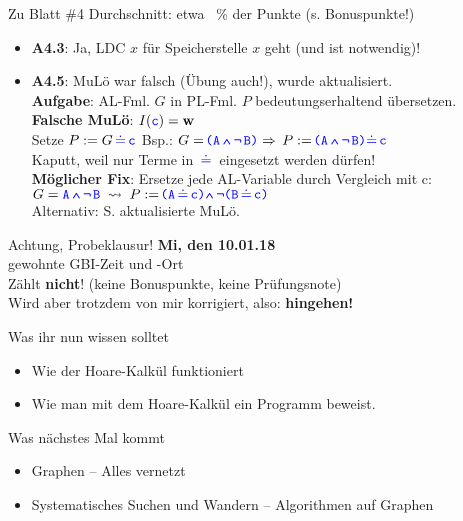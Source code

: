 \begin{frame}{Zu Blatt \#4}
	Durchschnitt: \quad etwa ~\% der Punkte (s. Bonuspunkte!)
	\begin{itemize}
		\item \textbf{A4.3}: Ja, LDC $x$ für Speicherstelle $x$ geht (und ist notwendig)!
		\item \textbf{A4.5}: MuLö war falsch (Übung auch!), wurde aktualisiert. \\
			  \textbf{Aufgabe}: \; AL-Fml. $G$ in PL-Fml. $P$ bedeutungserhaltend übersetzen. \\ 
			  \pause
			  \textbf{Falsche MuLö}: \; $I(\hbox{\textcolor{blue}{\texttt{c}}}) = \hbox{\textbf{w}}$ \\
			  \quad Setze $P := G \pleq \word c$ \qquad Bsp.: \; $G = \plka \word A \aland \alnot \word B \plkz \impl P := \plka \word A \aland \alnot \word B \plkz \pleq \word c$ \\ 
				  \pause 
				  \quad \impl Kaputt, weil nur Terme in $\pleq$ eingesetzt werden dürfen! \\
			  \pause
			  \textbf{Möglicher Fix}: \; Ersetze jede AL-Variable durch Vergleich mit \word c: \\
			  \quad $G = \word A \aland \alnot \word B \; \?> \; P := \plka \word A \pleq \word c\plkz \aland \alnot \plka \word B \pleq \word c\plkz$ \\
			  Alternativ: S. aktualisierte MuLö.
	\end{itemize}
\end{frame}

\begin{frame}{Achtung, Probeklausur!}
	\textbf{Mi, den 10.01.18} \\
	gewohnte GBI-Zeit und -Ort \\
	Zählt \textbf{nicht}! {\small (keine Bonuspunkte, keine Prüfungsnote)}\\
	Wird aber trotzdem von mir korrigiert, also: \textbf{hingehen!} \smiley
\end{frame}



\begin{frame}	
	\begin{block}{Was ihr nun wissen solltet}
		\begin{itemize}
			\item Wie der Hoare-Kalkül funktioniert
			\item Wie man mit dem Hoare-Kalkül ein Programm beweist.
		\end{itemize}
	\end{block}
	
	\begin{block}{Was nächstes Mal kommt}
		\begin{itemize}
			\item Graphen -- Alles vernetzt
			\item Systematisches Suchen und Wandern -- Algorithmen auf Graphen
		\end{itemize}
	\end{block}
\end{frame}


\slideThanks

